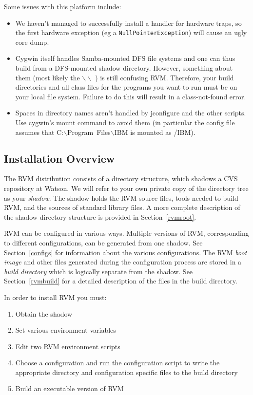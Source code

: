 Some issues with this platform include:

\begin{itemize}
\item We haven't managed to successfully install a handler for hardware traps,
so the first hardware exception (eg a {\tt NullPointerException}) will cause
an ugly core dump.
\item Cygwin itself handles Samba-mounted DFS file
systems and one can thus build from a DFS-mounted shadow
directory. However, something about them (most likely the 
$\backslash\backslash$ ) is
still confusing RVM.  Therefore, your build directories and all class
files for the programs you want to run must be on your local file
system. Failure to do this will result in a class-not-found error.
\item Spaces in directory names aren't handled by jconfigure and the
other scripts.  Use cygwin's mount command to avoid them (in
particular the config file assumes that
C:$\backslash$Program~Files$\backslash$IBM is mounted as /IBM).
\end{itemize}


\subsection{Installation Overview}
The RVM distribution consists of a directory structure, which shadows a
CVS repository at Watson. 
We will refer to your own private copy of the 
directory tree as your {\em shadow}.  The shadow holds the RVM 
source files, tools needed to build RVM, and the sources of standard
library files. 
A more complete description of the shadow directory structure
is provided in Section~\ref{rvmroot}.

RVM can be configured in various ways. Multiple versions of RVM,
corresponding to different configurations, can be generated from 
one shadow. See Section~\ref{configs} for information about the various 
configurations.
The RVM  {\em boot image} and other files generated during the 
configuration process
are stored in a {\em build directory} which is logically separate from 
the shadow. See Section~\ref{rvmbuild} for a detailed description of the
files in the build directory.

In order to install RVM  you must:
\begin{enumerate}
\item Obtain the shadow
\item Set various environment variables
\item Edit two RVM environment scripts
\item Choose a configuration and run the configuration script to write
the appropriate directory and configuration specific files to the
build directory
\item Build an executable version of RVM
\end{enumerate}

